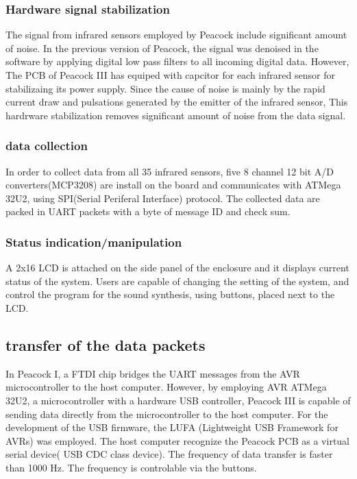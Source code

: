 \documentclass{nime-alternate}
\begin{document}
\subsubsection{Hardware signal stabilization} %
The signal from infrared sensors employed by Peacock include significant amount of noise. In the previous version of Peacock, the signal was denoised in the software by applying digital low pass filters to all incoming digital data. However, The PCB of Peacock III has equiped with capcitor for each infrared sensor for stabilizaing its power supply. Since the cause of noise is mainly by the rapid current draw and pulsations generated by the emitter of the infrared sensor, This hardrware stabilization removes significant amount of noise from the data signal.

\subsubsection{data collection} %
In order to collect data from all 35 infrared sensors, five 8 channel 12 bit A/D converters(MCP3208) are install on the board and communicates with ATMega 32U2, using SPI(Serial Periferal Interface) protocol. 
The collected data are packed in UART packets with a byte of message ID and check sum.

\subsubsection{Status indication/manipulation} %

A 2x16 LCD is attached on the side panel of the enclosure and it displays current status of the system. Users are capable of changing the setting of the system, and control the program for the sound synthesis, using buttons, placed next to the LCD.

\subsection{transfer of the data packets} %

In Peacock I, a FTDI chip bridges the UART messages from the AVR microcontroller to the host computer.
However, by employing AVR ATMega 32U2, a microcontroller with a hardware USB controller, Peacock III is capable of sending data directly from the microcontroller to the host computer. For the development of the USB firmware, the LUFA (Lightweight USB Framework for AVRs)\cite{camera:lufa} was employed. The host computer recognize the Peacock PCB as a virtual serial device( USB CDC class device). The frequency of data transfer is faster than 1000 Hz. The frequency is controlable via the buttons.
\end{document}
